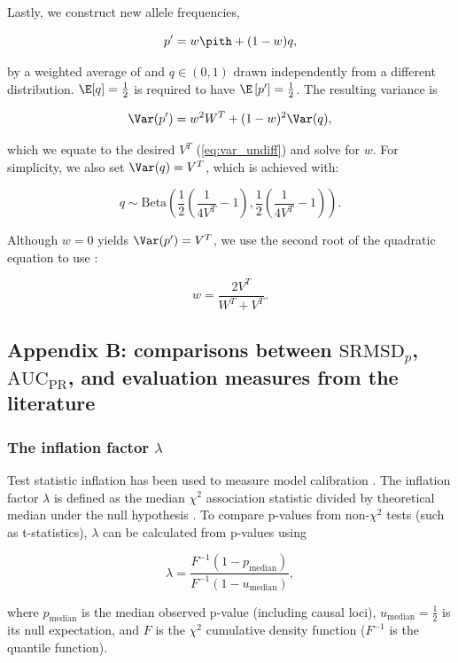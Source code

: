 \documentclass[11pt]{article}
\newcommand{\rmsd}{\text{SRMSD}_p}
\newcommand{\auc}{\text{AUC}_\text{PR}}
\begin{document}
\begin{linenumbers}
Lastly, we construct new allele frequencies,
\begin{linenomath*}
$$
p' = w \pith + ( 1 - w ) q,
$$
\end{linenomath*}
by a weighted average of \pith and $q \in (0, 1)$ drawn independently from a different distribution.
$\E[q] = \frac{1}{2}$ is required to have $\E \left[ p' \right] = \frac{1}{2}$.
The resulting variance is
\begin{linenomath*}
$$
\Var(p')
=
w^2 W^T + (1-w)^2 \Var(q)
,
$$
\end{linenomath*}
which we equate to the desired $V^T$ (\cref{eq:var_undiff}) and solve for $w$.
For simplicity, we also set $\Var(q) = V^T$, which is achieved with:
\begin{linenomath*}
$$
q \sim \text{Beta} \left( \frac{1}{2} \left( \frac{1}{ 4 V^T } - 1 \right), \frac{1}{2} \left( \frac{1}{ 4 V^T } - 1 \right) \right)
.
$$
\end{linenomath*}
Although $w=0$ yields $\Var(p') = V^T$, we use the second root of the quadratic equation to use \pith:
\begin{linenomath*}
$$
w = \frac{ 2 V^T }{ W^T + V^T }.
$$
\end{linenomath*}



\subsection{Appendix B: comparisons between $\rmsd$, $\auc$, and evaluation measures from the literature}

\subsubsection{The inflation factor $\lambda$}

Test statistic inflation has been used to measure model calibration \citep{astle_population_2009, price_new_2010}.
The inflation factor $\lambda$ is defined as the median $\chi^2$ association statistic divided by theoretical median under the null hypothesis \citep{devlin_genomic_1999}.
To compare p-values from non-$\chi^2$ tests (such as t-statistics), $\lambda$ can be calculated from p-values using
\begin{linenomath*}
$$
\lambda
=
\frac{
  F^{-1} \left( 1 - p_\text{median} \right)
}{
  F^{-1} \left( 1 - u_\text{median} \right)
}
,
$$
\end{linenomath*}
where $p_\text{median}$ is the median observed p-value (including causal loci),
$u_\text{median} = \frac{1}{2}$ is its null expectation,
and $F$ is the $\chi^2$ cumulative density function ($F^{-1}$ is the quantile function).


\end{linenumbers}
\end{document}
